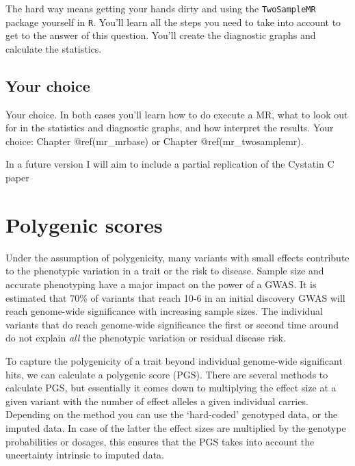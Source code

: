 \documentclass[
]{book}
\newcommand{\passthrough}[1]{#1}
\begin{document}
The hard way means getting your hands dirty and using the \passthrough{\lstinline!TwoSampleMR!} package yourself in \passthrough{\lstinline!R!}. You'll learn all the steps you need to take into account to get to the answer of this question. You'll create the diagnostic graphs and calculate the statistics.

\hypertarget{your-choice}{%
\subsection{Your choice}\label{your-choice}}

Your choice. In both cases you'll learn how to do execute a MR, what to look out for in the statistics and diagnostic graphs, and how interpret the results. Your choice: Chapter @ref(mr\_mrbase) or Chapter @ref(mr\_twosamplemr).

In a future version I will aim to include a partial replication of the Cystatin C paper\citep{vanderlaan2016}

\hypertarget{polygenic-scores}{%
\section{Polygenic scores}\label{polygenic-scores}}

Under the assumption of polygenicity, many variants with small effects contribute to the phenotypic variation in a trait or the risk to disease. Sample size and accurate phenotyping have a major impact on the power of a GWAS. It is estimated that 70\% of variants that reach 10-6 in an initial discovery GWAS will reach genome-wide significance with increasing sample sizes. The individual variants that do reach genome-wide significance the first or second time around do not explain \emph{all} the phenotypic variation or residual disease risk.

To capture the polygenicity of a trait beyond individual genome-wide significant hits, we can calculate a polygenic score (PGS). There are several methods to calculate PGS, but essentially it comes down to multiplying the effect size at a given variant with the number of effect alleles a given individual carries.
Depending on the method you can use the `hard-coded' genotyped data, or the imputed data. In case of the latter the effect sizes are multiplied by the genotype probabilities or dosages, this ensures that the PGS takes into account the uncertainty intrinsic to imputed data.
\end{document}
